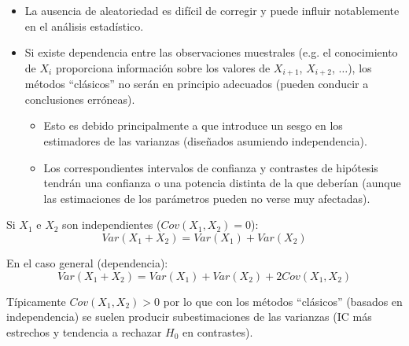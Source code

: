 \documentclass[
]{book}
\theoremstyle{break}
\theoremstyle{nonumberplain}
\begin{document}
\begin{itemize}
\item
  La ausencia de aleatoriedad es difícil de corregir y puede influir
  notablemente en el análisis estadístico.
\item
  Si existe dependencia entre las observaciones muestrales (e.g.
  el conocimiento de \(X_{i}\) proporciona información sobre los valores
  de \(X_{i+1}\), \(X_{i+2}\), \(\ldots\)), los métodos ``clásicos'' no serán
  en principio adecuados (pueden conducir a conclusiones erróneas).

  \begin{itemize}
  \item
    Esto es debido principalmente a que introduce un sesgo en los
    estimadores de las varianzas (diseñados asumiendo independencia).
  \item
    Los correspondientes intervalos de confianza y
    contrastes de hipótesis tendrán una confianza o una potencia
    distinta de la que deberían (aunque las estimaciones de los parámetros
    pueden no verse muy afectadas).
  \end{itemize}
\end{itemize}

Si \(X_{1}\) e \(X_{2}\) son independientes (\(Cov(X_{1},X_{2})=0\)):
\[Var(X_{1}+X_{2})=Var(X_{1})+Var(X_{2})\]

En el caso general (dependencia):
\[Var(X_{1}+X_{2})=Var(X_{1})+Var(X_{2})+2Cov(X_{1},X_{2})\]

Típicamente \(Cov(X_{1},X_{2})>0\) por lo que con los métodos
``clásicos'' (basados en independencia) se suelen producir
subestimaciones de las varianzas (IC más estrechos y tendencia a
rechazar \(H_{0}\) en contrastes).
\end{document}
